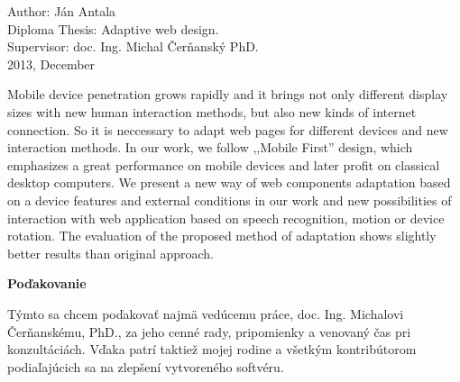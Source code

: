 Author: Ján Antala\\
Diploma Thesis: Adaptive web design. \\
Supervisor: doc. Ing. Michal Čerňanský PhD. \\
2013, December
\newline

Mobile device penetration grows rapidly and it brings not only different display sizes with new human interaction methods, but also new kinds of internet connection. So it is neccessary to adapt web pages for different devices and new interaction methods.
In our work, we follow ,,Mobile First'' design, which emphasizes a great performance on mobile devices and later profit on classical desktop computers. We present a new way of web components adaptation based on a device features and external conditions in our work and new possibilities of interaction with web application based on speech recognition, motion or device rotation.
The evaluation of the proposed method of adaptation shows slightly better results than original approach.



\pagebreak
\thispagestyle{empty}
\bigskip\vfil
 \noindent\textbf{Poďakovanie}
\bigskip

Týmto sa chcem poďakovať najmä vedúcemu práce, doc. Ing. Michalovi Čerňanskému, PhD.,
za jeho cenné rady, pripomienky a venovaný čas pri konzultáciách. Vďaka patrí taktiež mojej rodine a všetkým kontribútorom podiaľajúcich sa na zlepšení vytvoreného softvéru.
\pagebreak

\newpage
\setcounter{page}{1}
\thispagestyle{empty}
\setcounter{tocdepth}{3}
\tableofcontents %
\newpage 
\thispagestyle{empty}
\listoftables
\newpage
\thispagestyle{empty}
\listoffigures 
\newpage